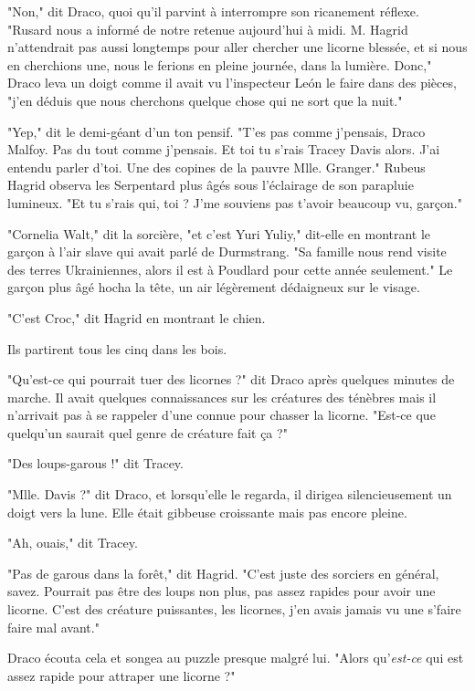 "Non," dit Draco, quoi qu'il parvint à interrompre son ricanement réflexe. "Rusard nous a informé de notre retenue aujourd'hui à midi. M. Hagrid n'attendrait pas aussi longtemps pour aller chercher une licorne blessée, et si nous en cherchions une, nous le ferions en pleine journée, dans la lumière. Donc," Draco leva un doigt comme il avait vu l'inspecteur León le faire dans des pièces, "j'en déduis que nous cherchons quelque chose qui ne sort que la nuit."

"Yep," dit le demi-géant d'un ton pensif. "T'es pas comme j'pensais, Draco Malfoy. Pas du tout comme j'pensais. Et toi tu s'rais Tracey Davis alors. J'ai entendu parler d'toi. Une des copines de la pauvre Mlle. Granger." Rubeus Hagrid observa les Serpentard plus âgés sous l'éclairage de son parapluie lumineux. "Et tu s'rais qui, toi ? J'me souviens pas t'avoir beaucoup vu, garçon."

"Cornelia Walt," dit la sorcière, "et c'est Yuri Yuliy," dit-elle en montrant le garçon à l'air slave qui avait parlé de Durmstrang. "Sa famille nous rend visite des terres Ukrainiennes, alors il est à Poudlard pour cette année seulement." Le garçon plus âgé hocha la tête, un air légèrement dédaigneux sur le visage.

"C'est Croc," dit Hagrid en montrant le chien.

Ils partirent tous les cinq dans les bois.

"Qu'est-ce qui pourrait tuer des licornes ?" dit Draco après quelques minutes de marche. Il avait quelques connaissances sur les créatures des ténèbres mais il n'arrivait pas à se rappeler d'une connue pour chasser la licorne. "Est-ce que quelqu'un saurait quel genre de créature fait ça ?"

"Des loups-garous !" dit Tracey.

"Mlle. Davis ?" dit Draco, et lorsqu'elle le regarda, il dirigea silencieusement un doigt vers la lune. Elle était gibbeuse croissante mais pas encore pleine.

"Ah, ouais," dit Tracey.

"Pas de garous dans la forêt," dit Hagrid. "C'est juste des sorciers en général, savez. Pourrait pas être des loups non plus, pas assez rapides pour avoir une licorne. C'est des créature puissantes, les licornes, j'en avais jamais vu une s'faire faire mal avant."

Draco écouta cela et songea au puzzle presque malgré lui. "Alors qu'\emph{est-ce}  qui est assez rapide pour attraper une licorne ?"

